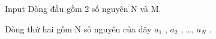 Input
Dòng đầu gồm 2 số nguyên N và M.  

   Dòng thứ hai gồm N số nguyên của dãy $a_{1}$   , $a_{2}$   , …, $a_{N}$   .